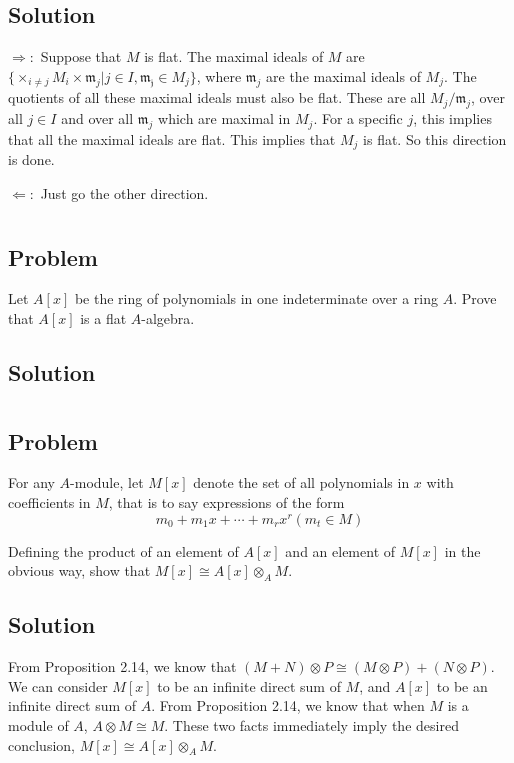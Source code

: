 \documentclass[book,12pt,oneside,openany]{memoir}
\begin{document}
\subsection{Solution}
$\Rightarrow:$ Suppose that $M$ is flat. The maximal ideals of $M$ are $\{\times_{i \neq j} M_i  \times \mathfrak{m}_j | j \in I, \mathfrak{m_j} \in M_j\}$, where $\mathfrak{m}_j$ are the maximal ideals of $M_j$. The quotients of all these maximal ideals must also be flat. These are all $M_j/\mathfrak{m}_j$, over all $j \in I$ and over all $\mathfrak{m}_j$ which are maximal in $M_j$. For a specific $j$, this implies that all the maximal ideals are flat. This implies that $M_j$ is flat. So this direction is done.

$\Leftarrow:$ Just go the other direction.


\section{}
\subsection{Problem}
Let $A[x]$ be the ring of polynomials in one indeterminate over a ring $A$. Prove that $A[x]$ is a flat $A$-algebra.
\subsection{Solution}



\section{}
\subsection{Problem}
For any $A$-module, let $M[x]$ denote the set of all polynomials in $x$ with coefficients in $M$, that is to say expressions of the form \[m_0 + m_1x + \cdots + m_rx^r (m_t \in M)\]

Defining the product of an element of $A[x]$ and an element of $M[x]$ in the obvious way, show that $M[x] \cong A[x] \otimes_{A} M$.

\subsection{Solution}
From Proposition 2.14, we know that $(M + N) \otimes P \cong (M \otimes P) + (N \otimes P)$. We can consider $M[x]$ to be an infinite direct sum of $M$, and $A[x]$ to be an infinite direct sum of $A$. From Proposition 2.14, we know that when $M$ is a module of $A$, $A \otimes M \cong M$. These two facts immediately imply the desired conclusion, $M[x] \cong A[x] \otimes_A M$.
\end{document}
